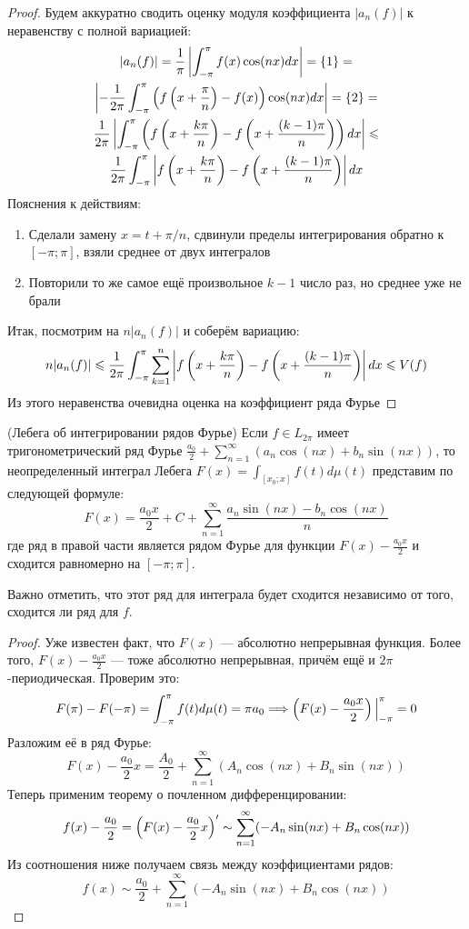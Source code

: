 \begin{proof}
	Будем аккуратно сводить оценку модуля коэффициента $|a_n(f)|$ к неравенству с полной вариацией:
	\begin{multline*}
		|a_n(f)| = \frac{1}{\pi}\left|\int_{-\pi}^\pi f(x)\cos(nx)dx\right| = \{1\} =
		\\
		\left|-\frac{1}{2\pi} \int_{-\pi}^\pi \left(f\left(x + \frac{\pi}{n}\right) - f(x)\right)\cos(nx)dx\right| = \{2\} =
		\\
		\frac{1}{2\pi} \left|\int_{-\pi}^\pi \left(f\left(x + \frac{k\pi}{n}\right) - f\left(x + \frac{(k - 1)\pi}{n}\right)\right)dx\right| \leqslant
		\\
		\frac{1}{2\pi} \int_{-\pi}^\pi \left|f\left(x + \frac{k\pi}{n}\right) - f\left(x + \frac{(k - 1)\pi}{n}\right)\right|dx
	\end{multline*}
	Пояснения к действиям:
	\begin{enumerate}
		\item Сделали замену $x = t + \pi / n$, сдвинули пределы интегрирования обратно к $[-\pi; \pi]$, взяли среднее от двух интегралов
		
		\item Повторили то же самое ещё произвольное $k - 1$ число раз, но среднее уже не брали
	\end{enumerate}
	Итак, посмотрим на $n|a_n(f)|$ и соберём вариацию:
	\[
		n|a_n(f)| \leqslant \frac{1}{2\pi} \int_{-\pi}^\pi \sum_{k = 1}^n \left|f\left(x + \frac{k\pi}{n}\right) - f\left(x + \frac{(k - 1)\pi}{n}\right)\right|dx \leqslant V(f)
	\]
	Из этого неравенства очевидна оценка на коэффициент ряда Фурье
\end{proof}

\begin{theorem} (Лебега об интегрировании рядов Фурье)
	Если $f \in L_{2\pi}$ имеет тригонометрический ряд Фурье $\frac{a_0}{2} + \sum_{n = 1}^\infty (a_n\cos(nx) + b_n\sin(nx))$, то неопределенный интеграл Лебега $F(x) = \int_{[x_0; x]} f(t)d\mu(t)$ представим по следующей формуле:
	\[
		F(x) = \frac{a_0x}{2} + C + \sum_{n = 1}^\infty \frac{a_n\sin(nx) - b_n\cos(nx)}{n}
	\]
	где ряд в правой части является рядом Фурье для функции $F(x) - \frac{a_0x}{2}$ и сходится равномерно на $[-\pi; \pi]$.
\end{theorem}

\begin{note}
	Важно отметить, что этот ряд для интеграла будет сходится независимо от того, сходится ли ряд для $f$.
\end{note}

\begin{proof}
	Уже известен факт, что $F(x)$ --- абсолютно непрерывная функция. Более того, $F(x) - \frac{a_0x}{2}$ --- тоже абсолютно непрерывная, причём ещё и $2\pi$-периодическая. Проверим это:
	\[
		F(\pi) - F(-\pi) = \int_{-\pi}^\pi f(t)d\mu(t) = \pi a_0 \Longrightarrow \left(F(x) - \frac{a_0x}{2}\right)\Big|_{-\pi}^\pi = 0
	\]
	Разложим её в ряд Фурье:
	\[
		F(x) - \frac{a_0}{2}x = \frac{A_0}{2} + \sum_{n = 1}^\infty (A_n\cos(nx) + B_n\sin(nx))
	\]
	Теперь применим теорему о почленном дифференцировании:
	\[
		f(x) - \frac{a_0}{2} = \left(F(x) - \frac{a_0}{2}x\right)' \sim \sum_{n = 1}^\infty (-A_n\sin(nx) + B_n\cos(nx))
	\]
	Из соотношения ниже получаем связь между коэффициентами рядов:
	\[
		f(x) \sim \frac{a_0}{2} + \sum_{n = 1}^\infty (-A_n\sin(nx) + B_n\cos(nx))
	\]
\end{proof}